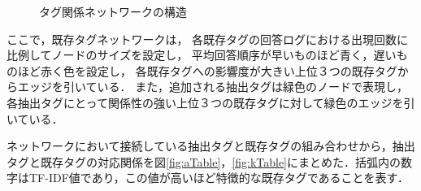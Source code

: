 \begin{figure}[h]
\begin{center}
\end{center}
\caption{タグ関係ネットワークの構造}
\label{fig:Network}
\end{figure}

ここで，既存タグネットワークは，
各既存タグの回答ログにおける出現回数に比例してノードのサイズを設定し，
平均回答順序が早いものほど青く，遅いものほど赤く色を設定し，
各既存タグへの影響度が大きい上位３つの既存タグからエッジを引いている．
また，追加される抽出タグは緑色のノードで表現し，
各抽出タグにとって関係性の強い上位３つの既存タグに対して緑色のエッジを引いている．

ネットワークにおいて接続している抽出タグと既存タグの組み合わせから，抽出タグと既存タグの対応関係を図\ref{fig:aTable}，\ref{fig:kTable}にまとめた．括弧内の数字はTF-IDF値であり，この値が高いほど特徴的な既存タグであることを表す．

